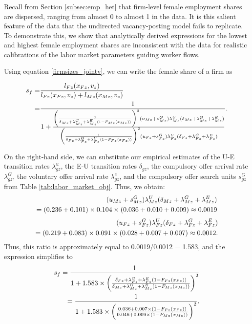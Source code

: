 Recall from Section \ref{subsec:emp_het} that firm-level female employment shares are dispersed, ranging from almost 0 to almost 1 in the data. It is this salient feature of the data that the undirected vacancy-posting model fails to replicate. To demonstrate this, we show that analytically derived expressions for the lowest and highest female employment shares are inconsistent with the data for realistic calibrations of the labor market parameters guiding worker flows.

Using equation \eqref{firmsizes_jointv}, we can write the female share of a firm as
%
\begin{normalsize}
    \begin{align}
        s_{f} = & \frac{l_{Fz}(x_{Fz},v_{z})}{l_{Fz}(x_{Fz},v_{z}) + l_{Mz}(x_{Mz},v_{z})} \\
        = & \frac{1}{1 + \frac{\biggl{(} \frac{1}{\delta_{Mz} + \lambda_{Mz}^{G} + \lambda_{Mz}^{E} (1 - F_{Mz}(x_{Mz}))} \biggr{)}^2 (u_{Mz} + s_{Mz}^{G}) \lambda_{Mz}^{U} (\delta_{Mz} + \lambda_{Mz}^{G} + \lambda_{Mz}^{E})}{\biggl{(} \frac{1}{\delta_{Fz} + \lambda_{Fz}^{G} + \lambda_{Fz}^{U} (1 - F_{Fz}(x_{Fz}))} \biggr{)}^2 (u_{Fz} + s_{Fz}^{G}) \lambda_{Fz}^{U} (\delta_{Fz} + \lambda_{Fz}^{G} + \lambda_{Fz}^{E})}}.
    \end{align}
\end{normalsize}
%
On the right-hand side, we can substitute our empirical estimates of the U-E transition rates $\lambda_{gz}^u$, the E-U transition rates $\delta_{gz}$, the compulsory offer arrival rate $\lambda_{gz}^{G}$, the voluntary offer arrival rate $\lambda_{gz}^e$, and the compulsory offer search units $s_{gz}^{G}$ from Table \ref{tab:labor_market_obj}. Thus, we obtain:
%
\begin{align}
    (u_{Mz} + s_{Mz}^{G}) \lambda_{Mz}^{U} (\delta_{Mz} + \lambda_{Mz}^{G} + \lambda_{Mz}^{E}) \\ \notag
    = (0.236 + 0.101) \times 0.104 \times (0.036 + 0.010 + 0.009) \approx 0.0019
\end{align}
\begin{align}
    (u_{Fz} + s_{Fz}^{G}) \lambda_{Fz}^{U} (\delta_{Fz} + \lambda_{Fz}^{G} + \lambda_{Fz}^{E}) \\ \notag
    = (0.219 + 0.083) \times 0.091 \times (0.028 + 0.007 + 0.007) \approx 0.0012 .
\end{align}
%
Thus, this ratio is approximately equal to 0.0019/0.0012 = 1.583, and the expression simplifies to
\begin{align}
    s_{f} = \frac{1}{1 + 1.583 \times \biggl{(} \frac{\delta_{Fz} + \lambda_{Fz}^{G} + \lambda_{Fz}^{E} (1 - F_{Fz}(x_{Fz}))}{\delta_{Mz} + \lambda_{Mz}^{G} + \lambda_{Mz}^{E} (1 - F_{Mz}(x_{Mz}))} \biggr{)}^2 } \\ \notag
    = \frac{1}{1 + 1.583 \times \biggl{(} \frac{0.036 + 0.007 \times (1 - F_{Fz}(x_{Fz}))}{0.046 + 0.009 \times (1 - F_{Mz}(x_{Mz}))} \biggr{)}^2 }.
\end{align}
